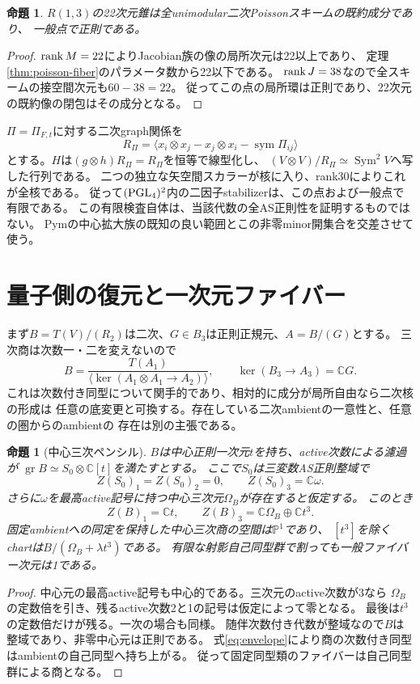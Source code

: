 \documentclass[11pt,a4paper]{ltjsarticle}
\newtheorem{proposition}[theorem]{命題}
\theoremstyle{definition}\newtheorem{remark}[theorem]{注意}
\newcommand{\PP}{\mathbb P}\newcommand{\kk}{\mathbb C}
\newcommand{\Sym}{\operatorname{Sym}}\newcommand{\qgr}{\operatorname{qgr}}
\begin{document}
\begin{proposition}\label{prop:reduced}
$R(1,3)$の22次元錐は全unimodular二次Poissonスキームの既約成分であり、
一般点で正則である。
\end{proposition}
\begin{proof}
$\operatorname{rank} M=22$によりJacobian族の像の局所次元は22以上であり、
定理\ref{thm:poisson-fiber}のパラメータ数から22以下である。
$\operatorname{rank} J=38$なので全スキームの接空間次元も$60-38=22$。
従ってこの点の局所環は正則であり、22次元の既約像の閉包はその成分となる。
\end{proof}

$\Pi=\Pi_{F,t}$に対する二次graph関係を
\[
 R_\Pi=\langle x_i\otimes x_j-x_j\otimes x_i-\operatorname{sym}\Pi_{ij}\rangle
\]
とする。$H$は$(g\otimes h)R_\Pi=R_\Pi$を恒等で線型化し、
$(V\otimes V)/R_\Pi\simeq\Sym^2V$へ写した行列である。
二つの独立な矢空間スカラーが核に入り、rank30によりこれが全核である。
従って$(\operatorname{PGL}_4)^2$内の二因子stabilizerは、この点および一般点で有限である。
この有限検査自体は、当該代数の全AS正則性を証明するものではない。
Pymの中心拡大族の既知の良い範囲とこの非零minor開集合を交差させて使う。

\section{量子側の復元と一次元ファイバー}\label{sec:surface-fiber}
まず$B=T(V)/(R_2)$は二次、$G\in B_3$は正則正規元、$A=B/(G)$とする。
三次商は次数一・二を変えないので
\begin{equation}\label{eq:envelope}
 B=\frac{T(A_1)}{\langle\ker(A_1\otimes A_1\to A_2)\rangle},\qquad
 \ker(B_3\to A_3)=\kk G.
\end{equation}
これは次数付き同型について関手的であり、相対的に成分が局所自由なら二次核の形成は
任意の底変更と可換する。存在している二次ambientの一意性と、任意の圏からのambientの
存在は別の主張である。

\begin{proposition}[中心三次ペンシル]\label{prop:center}
$B$は中心正則一次元$t$を持ち、active次数による濾過が
$\operatorname{gr}B\simeq S_0\otimes\kk[t]$を満たすとする。
ここで$S_0$は三変数AS正則整域で
\[
 Z(S_0)_1=Z(S_0)_2=0,\qquad Z(S_0)_3=\kk\omega.
\]
さらに$\omega$を最高active記号に持つ中心三次元$\Omega_B$が存在すると仮定する。
このとき
\[
 Z(B)_1=\kk t,\qquad Z(B)_3=\kk\Omega_B\oplus\kk t^3.
\]
固定ambientへの同定を保持した中心三次商の空間は$\PP^1$であり、
$[t^3]$を除くchartは$B/(\Omega_B+\lambda t^3)$である。
有限な射影自己同型群で割っても一般ファイバー次元は1である。
\end{proposition}
\begin{proof}
中心元の最高active記号も中心的である。三次元のactive次数が3なら
$\Omega_B$の定数倍を引き、残るactive次数2と1の記号は仮定によって零となる。
最後は$t^3$の定数倍だけが残る。一次の場合も同様。
随伴次数付き代数が整域なので$B$は整域であり、非零中心元は正則である。
式\eqref{eq:envelope}により商の次数付き同型はambientの自己同型へ持ち上がる。
従って固定同型類のファイバーは自己同型群による商となる。
\end{proof}
\end{document}

